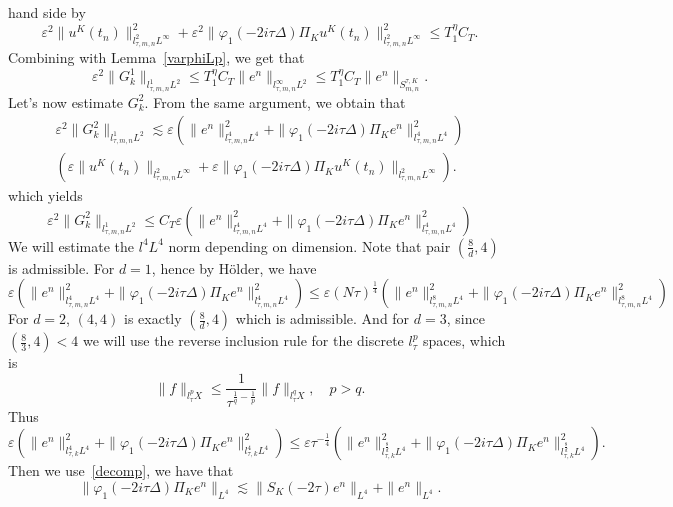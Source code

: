 \documentclass[10pt,a4paper]{article}
\begin{document}
  hand side by 
  \[ \varepsilon^2 \|u^K(t_n)\|_{l^2_{\tau,m,n}L^\infty}^2 + \varepsilon^2 
  \|\varphi_1(-2i\tau\Delta)\Pi_K u^K(t_n)\|_{l^2_{\tau,m,n}L^\infty}^2 \leq T_1^\eta C_T. \] 
  Combining with Lemma~\ref{varphiLp}, we get that
  \begin{equation}\label{G1}
    \varepsilon^2\|G_k^1\|_{l^1_{\tau,m,n}L^2} \leq T_1^\eta C_T \|e^n\|_{l^\infty_{\tau,m,n}L^2}
    \leq T_1^\eta C_T \|e^n\|_{S^{\tau,K}_{m,n}}.
  \end{equation}
  Let's now estimate \(G_k^2\). From the same argument, we obtain that 
  \begin{multline*}
    \varepsilon^2\|G_k^2\|_{l^1_{\tau,m,n}L^2} \lesssim  \varepsilon
    \left(\|e^n\|^2_{l^4_{\tau,m,n}L^4} + \|\varphi_1(-2i\tau\Delta)\Pi_K e^n\|^2_{l^4_{\tau,m,n}L^4} \right) \\
    \left( \varepsilon \|u^K(t_n)\|_{l^2_{\tau,m,n}L^\infty} + 
    \varepsilon \|\varphi_1(-2i\tau\Delta)\Pi_K u^K(t_n)\|_{l^2_{\tau,m,n}L^\infty} \right).
  \end{multline*}
  which yields 
  \[ \varepsilon^2\|G_k^2\|_{l^1_{\tau,m,n}L^2} \leq  C_T \varepsilon
  \left(\|e^n\|^2_{l^4_{\tau,m,n}L^4} + \|\varphi_1(-2i\tau\Delta)\Pi_K e^n\|^2_{l^4_{\tau,m,n}L^4} \right)
  \]
  We will estimate the \(l^4L^4\) norm depending on dimension. Note that pair 
  \((\frac8d,4)\) is admissible. For \(d=1\), hence by H\"older, we have 
  \begin{equation*}
      \varepsilon \left(\|e^n\|^2_{l^4_{\tau,m,n}L^4} + \|\varphi_1(-2i\tau\Delta)\Pi_K e^n\|^2_{l^4_{\tau,m,n}L^4} \right)
      \leq \varepsilon (N\tau)^{\frac14} \left(\|e^n\|^2_{l^8_{\tau,m,n}L^4} 
      + \|\varphi_1(-2i\tau\Delta)\Pi_K e^n\|^2_{l^8_{\tau,m,n}L^4} \right)
  \end{equation*}
  For \(d=2\), \((4,4)\) is exactly \((\frac8d,4)\) which is admissible. And for
  \(d=3\), since \((\frac83,4) < 4\) we will use the reverse inclusion rule for
  the discrete \(l^p_\tau\) spaces, which is 
  \[ \|f\|_{l^p_\tau X} \leq \frac1{\tau^{\frac1q-\frac1p}} \|f\|_{l^q_\tau X}, 
  \quad p > q.\]
  Thus 
  \[ \varepsilon \left(\|e^n\|^2_{l^4_{\tau,k}L^4} + \|\varphi_1(-2i\tau\Delta)\Pi_K e^n\|^2_{l^4_{\tau,k}L^4} \right)
  \leq \varepsilon \tau^{-\frac14} \left(\|e^n\|^2_{l^\frac8d_{\tau,k}L^4} + 
  \|\varphi_1(-2i\tau\Delta)\Pi_K e^n\|^2_{l^\frac8d_{\tau,k}L^4}\right). \]
  Then we use~\eqref{decomp}, we have that 
  \begin{equation*}\label{phie}
    \|\varphi_1(-2i\tau\Delta)\Pi_K e^n\|_{L^4} 
    \lesssim \|S_K(-2\tau)e^n\|_{L^4} + 
    \|e^n\|_{L^4}.
  \end{equation*}
\end{document}

